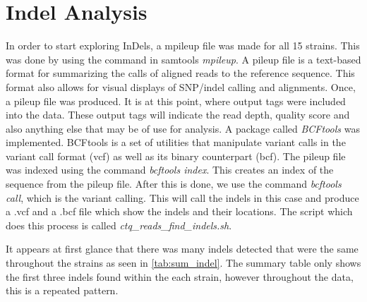 \documentclass[12pt]{article}
\begin{document}
\section{Indel Analysis}
\vspace{-0.5cm}
In order to start exploring InDels, a mpileup file was made for all 15 strains. This was done by using the command in samtools \textit{mpileup}. A pileup file is a text-based format for summarizing the calls of aligned reads to the reference sequence. This format also allows for visual displays of SNP/indel calling and alignments. Once, a pileup file was produced. It is at this point, where output tags were included into the data. These output tags will indicate the read depth, quality score and also anything else that may be of use for analysis.  A package called \textit{BCFtools} was implemented. BCFtools is a set of utilities that manipulate variant calls in the variant call format (vcf) as well as its binary counterpart (bcf). The pileup file was indexed using the command \textit{bcftools index}. This creates an index of the sequence from the pileup file. After this is done, we use the command \textit{bcftools call}, which is the variant calling. This will call the indels in this case and produce a .vcf and a .bcf file which show the indels and their locations. The script which does this process is called \textit{ctq\_reads\_find\_indels.sh}. 

It appears at first glance that there was many indels detected that were the same throughout the strains as seen in \ref{tab:sum_indel}. The summary table only shows the first three indels found within the each strain, however throughout the data, this is a repeated pattern. 
\end{document}
